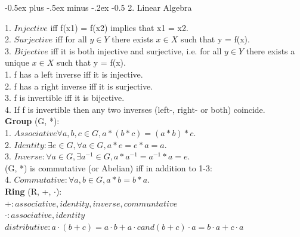 \documentclass[10pt,landscape]{article}
\makeatletter
\renewcommand{\section}{\@startsection{section}{1}{0mm}%
                                {-0.5ex plus -.5ex minus -.2ex}%
                                {-0.5\baselineskip}%
                                {\normalfont\small\bfseries}}
\makeatother
\begin{document}
\raggedright

\scriptsize

\begin{multicols*}{4}

\setlength{\columnseprule}{0.25pt}
\setlength{\premulticols}{0.25pt}
\setlength{\postmulticols}{0.25pt}
\setlength{\multicolsep}{0.25pt}
\setlength{\columnsep}{0.25pt}

\section{2. Linear Algebra}

1. $Injective$ iff f(x1) = f(x2) implies that x1 = x2.\\
2. $Surjective$ iff for all $y \in Y$ there exists $x \in X$ such that y = f(x).\\
3. $Bijective$ iff it is both injective and surjective, i.e. for all $y \in Y$ there exists a unique $x \in X$ such that y = f(x).\\

1. f has a left inverse iff it is injective.\\
2. f has a right inverse iff it is surjective.\\
3. f is invertible iff it is bijective.\\
4. If f is invertible then any two inverses (left-, right- or both) coincide.\\

\textbf{Group} (G, *):\\
1. $Associative \forall a, b, c \in G, a * (b * c) = (a * b) * c$.\\
2. $Identity: \exists e \in G, \forall a \in G, a * e = e * a = a.$\\
3. $Inverse: \forall a \in G, \exists a^{-1} \in G, a * a ^{-1} = a^{-1} * a = e.$\\
(G, *) is commutative (or Abelian) iff in addition to 1-3:\\
4. $Commutative: \forall a, b \in G, a * b = b * a.$\\

\textbf{Ring} (R, +, $\cdot$):\\
$+: associative, identity, inverse, communtative$\\
$\cdot : associative, identity$\\
$distributive: a \cdot (b+c) = a \cdot b + a \cdot c and (b + c) \cdot a = b \cdot a + c \cdot a$\\


\end{multicols*}
\end{document}
